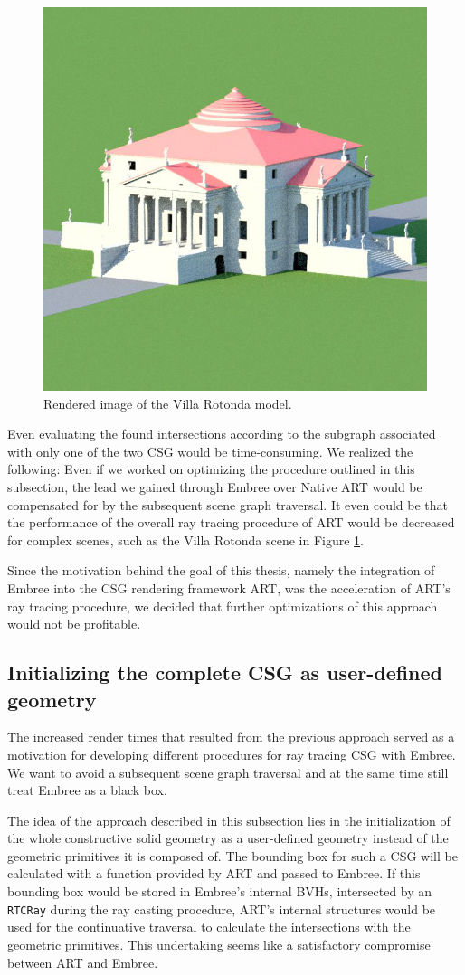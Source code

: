 \begin{figure}
	\centering
	\includegraphics[width=.5\linewidth]{img/3 approach/villaRotondaNormal.png}
	\caption{Rendered image of the Villa Rotonda model.}
	\label{fig:rotonda_intro}
\end{figure}

Even evaluating the found intersections according to the subgraph associated with only one of the two CSG would be time-consuming. We realized the following: Even if we worked on optimizing the procedure outlined in this subsection, the lead we gained through Embree over Native ART would be compensated for by the subsequent scene graph traversal. It even could be that the performance of the overall ray tracing procedure of ART would be decreased for complex scenes, such as the Villa Rotonda scene in Figure \ref{fig:rotonda_intro}.

Since the motivation behind the goal of this thesis, namely the integration of Embree into the CSG rendering framework ART, was the acceleration of ART's ray tracing procedure, we decided that further optimizations of this approach would not be profitable.


\subsection{Initializing the complete CSG as user-defined geometry}
\label{subsec:apprach2}

The increased render times that resulted from the previous approach served as a motivation for developing different procedures for ray tracing CSG with Embree. We want to avoid a subsequent scene graph traversal and at the same time still treat Embree as a black box.

The idea of the approach described in this subsection lies in the initialization of the whole constructive solid geometry as a user-defined geometry instead of the geometric primitives it is composed of. The bounding box for such a CSG will be calculated with a function provided by ART and passed to Embree.
If this bounding box would be stored in Embree's internal BVHs, intersected by an \texttt{RTCRay} during the ray casting procedure, ART's internal structures would be used for the continuative traversal to calculate the intersections with the geometric primitives. This undertaking seems like a satisfactory compromise between ART and Embree.
 
